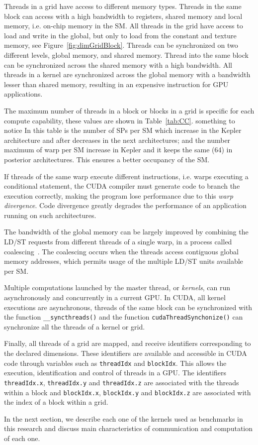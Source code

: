 Threads in a grid have access to different memory types. Threads in the same block can access with a high bandwidth to registers, shared memory and local memory, i.e. on-chip memory in the SM. All threads in the grid have access to load and write in the global, but only to load from the constant and texture memory, see Figure~\ref{fig:dimGridBlock}. Threads can be synchronized on two different levels, global memory, and shared memory. Thread into the same block can be synchronized across the shared memory with a high bandwidth. All threads in a kernel are synchronized across the global memory with a bandwidth lesser than shared memory, resulting in an expensive instruction for GPU applications.

The maximum number of threads in a block or blocks in a grid is specific for each compute capability, these values are shown in Table~\ref{tab:CC}. something to notice In this table is the number of SPs per SM which increase in the Kepler architecture and after decreases in the next architectures; and the number maximum of warp per SM increase in Kepler and it keeps  the same (64) in posterior architectures. This ensures a better occupancy of the SM.

If threads of the same warp execute different instructions, i.e. warps executing a conditional statement, the CUDA compiler must generate code to branch the execution correctly, making the program lose performance due to this \emph{warp divergence}. Code divergence greatly degrades the performance of an application running on such architectures. 

The bandwidth of the global memory can be largely improved by combining the LD/ST requests from different threads of a single warp, in a process called coalescing~\citep{confwdagHaTA08}. The coalescing occurs when the threads access contiguous global memory addresses, which permits usage of the multiple LD/ST units available per SM.%

Multiple computations launched by the master thread, or \textit{kernels}, can run asynchronously and concurrently in a current GPU. In CUDA, all kernel executions are asynchronous, threads of the same block can be synchronized with the function \texttt{{\_\_}syncthreads()} and the function \texttt{cudaThreadSynchonize()} can synchronize all the threads of a kernel or grid. 

Finally, all threads of a grid are mapped, and receive identifiers corresponding to the declared dimensions. These identifiers
are available and accessible in CUDA code through variables such as \texttt{threadIdx} and \texttt{blockIdx}. This allows the execution, identification and control of threads in a GPU. The identifiers \texttt{threadIdx.x}, \texttt{threadIdx.y} and \texttt{threadIdx.z} are associated with the threads within a block and \texttt{blockIdx.x}, \texttt{blockIdx.y} and \texttt{blockIdx.z} are associated with the index of a block within a grid.

In the next section, we describe each one of the kernels used as benchmarks in this research and discuss main characteristics of communication and computation of each one. 
